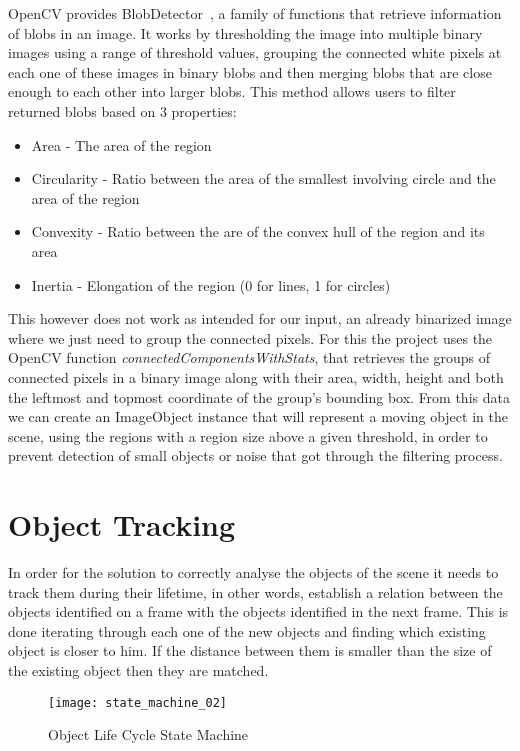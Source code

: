 OpenCV provides BlobDetector~\cite{opencv_opencv:_2017},  a family of functions that retrieve information of blobs in an image. It works by thresholding the image into multiple binary images using a range of threshold values, grouping the connected white pixels at each one of these images in binary blobs and then merging blobs that are close enough to each other into larger blobs. This method allows users to filter returned blobs based on 3 properties:

\begin{itemize}
	\item Area - The area of the region
	\item Circularity - Ratio between the area of the smallest involving circle and the area of the region
	\item Convexity - Ratio between the are of the convex hull of the region and its area
	\item Inertia - Elongation of the region (0 for lines, 1 for circles)
\end{itemize}

This however does not work as intended for our input, an already binarized image where we just need to group the connected pixels. For this the project uses the OpenCV function \textit{connectedComponentsWithStats}, that retrieves the groups of connected pixels in a binary image along with their area, width, height and both the leftmost and topmost coordinate of the group's bounding box. From this data we can create an ImageObject instance that will represent a moving object in the scene, using the regions with a region size above a given threshold, in order to prevent detection of small objects or noise that got through the filtering process.

\section{Object Tracking}

In order for the solution to correctly analyse the objects of the scene it needs to track them during their lifetime, in other words, establish a relation between the objects identified on a frame with the objects identified in the next frame. This is done iterating through each one of the new objects and finding which existing object is closer to him. If the distance between them is smaller than the size of the existing object then they are matched.

\begin{figure}[h]
  \begin{center}
    \leavevmode
    \texttt{[image: state\_machine\_02]}
    \caption{Object Life Cycle State Machine}
    \label{fig:object_state_machine}
  \end{center}
\end{figure}

